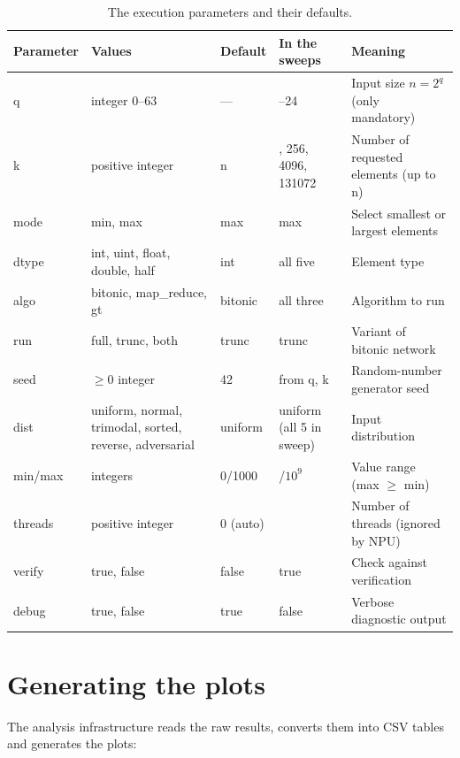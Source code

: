 \begin{table}[H]
    \centering
    \footnotesize
    \setlength{\tabcolsep}{4pt}
    \begin{tabularx}{\textwidth}{@{} l >{\raggedright\arraybackslash}X l >{\raggedright\arraybackslash}X >{\raggedright\arraybackslash}X @{}}
        \toprule
        \textbf{Parameter} & \textbf{Values} & \textbf{Default} & \textbf{In the sweeps} & \textbf{Meaning} \\
        \midrule
        q & integer 0--63 & --- & 3--24 & Input size $n = 2^q$ (only mandatory) \\
        k & positive integer & n & 8, 256, 4096, 131072 & Number of requested elements (up to n) \\
        mode & min, max & max & max & Select smallest or largest elements \\
        dtype & int, uint, float, double, half & int & all five & Element type \\
        algo & bitonic, map\_reduce, gt & bitonic & all three & Algorithm to run \\
        run & full, trunc, both & trunc & trunc & Variant of bitonic network \\
        seed & $\ge 0$ integer & 42 & from q, k & Random-number generator seed \\
        dist & uniform, normal, trimodal, sorted, reverse, adversarial & uniform & uniform (all 5 in sweep) & Input distribution \\
        min/max & integers & 0/1000 & 0/$10^9$ & Value range (max $\ge$ min) \\
        threads & positive integer & 0 (auto) & 8 & Number of threads (ignored by NPU) \\
        verify & true, false & false & true & Check against verification \\
        debug & true, false & true & false & Verbose diagnostic output \\
        \bottomrule
    \end{tabularx}
    \caption{The execution parameters and their defaults.}
    \label{tab:cli}
\end{table}

\section{Generating the plots}
\label{sec:repro-plots}

The analysis infrastructure reads the raw results, converts them into CSV
tables and generates the plots:

